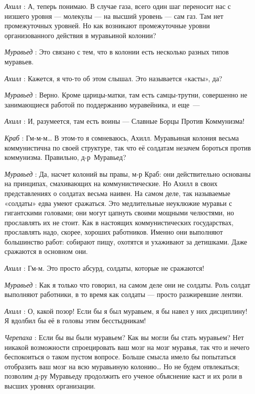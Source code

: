 \documentclass[../main.tex]{subfiles}
\begin{document}
\begin{dialogue}
\emph{Ахилл} : А, теперь понимаю. В случае газа, всего один шаг переносит нас с низшего уровня --- молекулы --- на высший уровень --- сам газ. Там нет промежуточных уровней. Но как возникают промежуточные уровни организованного действия в муравьиной колонии?

\emph{Муравьед} : Это связано с тем, что в колонии есть несколько разных типов муравьев.

\emph{Ахилл} : Кажется, я что-то об этом слышал. Это называется «касты», да?

\emph{Муравьед} : Верно. Кроме царицы-матки, там есть самцы-трутни, совершенно не занимающиеся работой по поддержанию муравейника, и еще~---

\emph{Ахилл} : И, разумеется, там есть воины --- Славные Борцы Против Коммунизма!

\emph{Краб} : Гм-м-м\ldots{} В этом-то я сомневаюсь, Ахилл. Муравьиная колония весьма коммунистична по своей структуре, так что её солдатам незачем бороться против коммунизма. Правильно, д-р~Муравьед?

\emph{Муравьед} : Да, насчет колоний вы правы, м-р Краб: они действительно основаны на принципах, смахивающих на коммунистические. Но Ахилл в своих представлениях о солдатах весьма наивен. На самом деле, так называемые «солдаты» едва умеют сражаться. Это медлительные неуклюжие муравьи с гигантскими головами; они могут цапнуть своими мощными челюстями, но прославлять их не стоит. Как в настоящих коммунистических государствах, прославлять надо, скорее, хороших работников. Именно они выполняют большинство работ: собирают пищу, охотятся и ухаживают за детишками. Даже сражаются в основном они.

\emph{Ахилл} : Гм-м. Это просто абсурд, солдаты, которые не сражаются!

\emph{Муравьед} : Как я только что говорил, на самом деле они не солдаты. Роль солдат выполняют работники, в то время как солдаты --- просто разжиревшие лентяи.

\emph{Ахилл} : О, какой позор! Если бы я был муравьем, я бы навел у них дисциплину! Я вдолбил бы её в головы этим бесстыдникам!

\emph{Черепаха} : Если бы вы были муравьем? Как вы могли бы стать муравьем? Нет никакой возможности спроецировать ваш мозг на мозг муравья, так что и нечего беспокоиться о таком пустом вопросе. Больше смысла имело бы попытаться отобразить ваш мозг на всю муравьиную колонию\ldots{} Но не будем отвлекаться; позволим д-ру Муравьеду продолжить его ученое объяснение каст и их роли в высших уровнях организации.


\end{dialogue}
\end{document}
